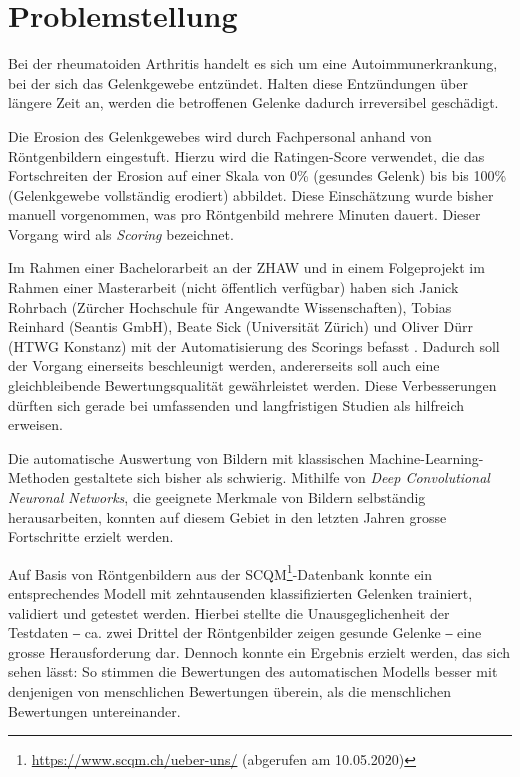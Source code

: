 \section{Problemstellung}
\label{sec:Problemstellung}

Bei der rheumatoiden Arthritis handelt es sich um eine Autoimmunerkrankung, bei der sich das Gelenkgewebe entzündet. Halten diese Entzündungen über längere Zeit an, werden die betroffenen Gelenke dadurch irreversibel geschädigt.

Die Erosion des Gelenkgewebes wird durch Fachpersonal anhand von Röntgenbildern eingestuft. Hierzu wird die Ratingen-Score verwendet, die das Fortschreiten der Erosion auf einer Skala von 0\% (gesundes Gelenk) bis bis 100\% (Gelenkgewebe vollständig erodiert) abbildet. Diese Einschätzung wurde bisher manuell vorgenommen, was pro Röntgenbild mehrere Minuten dauert. Dieser Vorgang wird als \textit{Scoring} bezeichnet.

Im Rahmen einer Bachelorarbeit an der ZHAW \cite{rohrbach2017} und in einem Folgeprojekt im Rahmen einer Masterarbeit (nicht öffentlich verfügbar) haben sich Janick Rohrbach (Zürcher Hochschule für Angewandte Wissenschaften), Tobias Reinhard (Seantis GmbH), Beate Sick (Universität Zürich) und Oliver Dürr (HTWG Konstanz) mit der Automatisierung des Scorings befasst \cite{rohrbach2019}. Dadurch soll der Vorgang einerseits beschleunigt werden, andererseits soll auch eine gleichbleibende Bewertungsqualität gewährleistet werden. Diese Verbesserungen dürften sich gerade bei umfassenden und langfristigen Studien als hilfreich erweisen.

Die automatische Auswertung von Bildern mit klassischen Machine-Learning-Metho\-den gestaltete sich bisher als schwierig. Mithilfe von \textit{Deep Convolutional Neuronal Networks}, die geeignete Merkmale von Bildern selbständig herausarbeiten, konnten auf diesem Gebiet in den letzten Jahren grosse Fortschritte erzielt werden.

Auf Basis von Röntgenbildern aus der SCQM\footnote{\url{https://www.scqm.ch/ueber-uns/} (abgerufen am 10.05.2020)}-Datenbank konnte ein entsprechendes Modell mit zehntausenden klassifizierten Gelenken trainiert, validiert und getestet werden. Hierbei stellte die Unausgeglichenheit der Testdaten ‒ ca. zwei Drittel der Röntgenbilder zeigen gesunde Gelenke ‒ eine grosse Herausforderung dar. Dennoch konnte ein Ergebnis erzielt werden, das sich sehen lässt: So stimmen die Bewertungen des automatischen Modells besser mit denjenigen von menschlichen Bewertungen überein, als die menschlichen Bewertungen untereinander.

